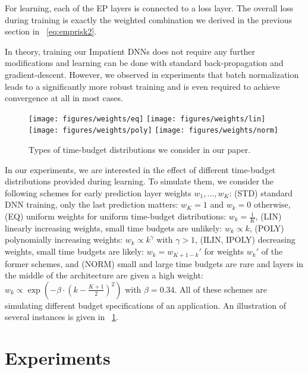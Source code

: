\documentclass{bmvc2k}
\begin{document}
    For learning, each of the EP layers is connected to a loss layer.
    The overall loss during training is exactly the weighted combination we derived in the
    previous section in \equationname~\eqref{eq:emprisk2}.

    In theory, training our Impatient DNNs does not require any further modifications
    and learning can be done with standard back-propagation and gradient-descent.
    However, we observed in experiments that batch normalization~\cite{ioffe2015batch} leads
    to a significantly more robust training and is even required to achieve convergence
    at all in most cases.

    \begin{figure}[tb]
        \texttt{[image: figures/weights/eq]}
        \texttt{[image: figures/weights/lin]}
        \texttt{[image: figures/weights/poly]}
        \texttt{[image: figures/weights/norm]}
        \caption{Types of time-budget distributions we consider in our paper.}
        \label{fig:budgettypes}
    \end{figure}
    In our experiments, we are interested in the effect of different time-budget distributions provided during learning.
    To simulate them, we consider the following schemes for early prediction layer weights $w_1, \ldots, w_K$:
%
%
    (STD) standard DNN training, \ie only the last prediction matters: $w_K = 1$ and $w_k = 0$ otherwise,
    (EQ) uniform weights for uniform time-budget distributions: $w_k = \frac{1}{K}$,
    (LIN) linearly increasing weights, \ie small time budgets are unlikely: $w_k \propto k$,
    (POLY) polynomially increasing weights: $w_k \propto k^\gamma$ with $\gamma > 1$,
    (ILIN, IPOLY) decreasing weights, \ie small time budgets are likely: $w_k = w_{K+1-k}'$ for weights $w_k'$ of the former schemes,
    and (NORM) small and large time budgets are rare and layers in the middle of the architecture are given a high weight: $w_k \propto \exp(- \beta \cdot (k-\frac{K+1}{2})^2)$ with $\beta = 0.34$.
%
    All of these schemes are simulating different budget specifications of an application.
    An illustration of several instances is given in \figurename~\ref{fig:budgettypes}.

\section{Experiments}
\label{sec:exp}
\end{document}
